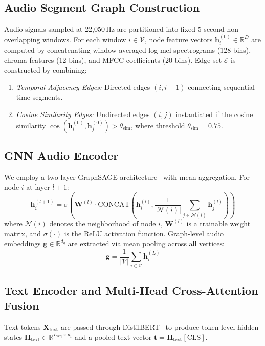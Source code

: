 \documentclass[10pt,twocolumn]{article}
\begin{document}
\subsection{Audio Segment Graph Construction}
Audio signals sampled at 22,050\,Hz are partitioned into fixed 5-second non-overlapping windows. For each window $i \in \mathcal{V}$, node feature vectors $\mathbf{h}_i^{(0)} \in \mathbb{R}^D$ are computed by concatenating window-averaged log-mel spectrograms (128 bins), chroma features (12 bins), and MFCC coefficients (20 bins). Edge set $\mathcal{E}$ is constructed by combining:
\begin{enumerate}
    \item \emph{Temporal Adjacency Edges:} Directed edges $(i, i+1)$ connecting sequential time segments.
    \item \emph{Cosine Similarity Edges:} Undirected edges $(i, j)$ instantiated if the cosine similarity $\cos(\mathbf{h}_i^{(0)}, \mathbf{h}_j^{(0)}) > \theta_{\text{sim}}$, where threshold $\theta_{\text{sim}} = 0.75$.
\end{enumerate}

\subsection{GNN Audio Encoder}
We employ a two-layer GraphSAGE architecture~\cite{graphsage} with mean aggregation. For node $i$ at layer $l+1$:
\begin{equation}
\mathbf{h}_i^{(l+1)} = \sigma \left( \mathbf{W}^{(l)} \cdot \text{CONCAT} \left( \mathbf{h}_i^{(l)}, \frac{1}{|\mathcal{N}(i)|} \sum_{j \in \mathcal{N}(i)} \mathbf{h}_j^{(l)} \right) \right)
\end{equation}
where $\mathcal{N}(i)$ denotes the neighborhood of node $i$, $\mathbf{W}^{(l)}$ is a trainable weight matrix, and $\sigma(\cdot)$ is the ReLU activation function. Graph-level audio embeddings $\mathbf{g} \in \mathbb{R}^{d_g}$ are extracted via mean pooling across all vertices:
\begin{equation}
\mathbf{g} = \frac{1}{|\mathcal{V}|} \sum_{i \in \mathcal{V}} \mathbf{h}_i^{(L)}
\end{equation}

\subsection{Text Encoder and Multi-Head Cross-Attention Fusion}
Text tokens $\mathbf{X}_{\text{text}}$ are passed through DistilBERT~\cite{distilbert} to produce token-level hidden states $\mathbf{H}_{\text{text}} \in \mathbb{R}^{L_{\text{seq}} \times d_t}$ and a pooled text vector $\mathbf{t} = \mathbf{H}_{\text{text}}[\text{CLS}]$.
\end{document}
